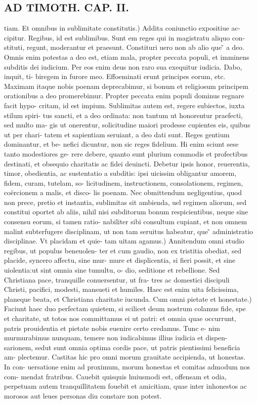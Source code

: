 \documentclass{article}
\begin{document}
\begin{pages}
\section*{AD TIMOTH. CAP. II. }
\marginpar{[ p.481 ]}\pstart tiam. Et omnibus in sublimitate constitutis.) Addita coniunctio expositiue ac- cipitur. Regibus, id est sublimibus. Sunt em reges qui in magistratu aliquo con- stituti, regunt, moderantur et praesunt. Constituri uero non ab alio que ̃ a deo. Omnis enim potestas a deo est, etiam mala, propter peccata populi, et imminens subditis dei iudicium. Per eos enim deus non raro sua exequitur iudicia. Dabo, inquit, ti- biregem in furore meo. Effoeminati erunt principes eorum, etc. Maximam itaque  nobis poenam deprecabimur, si bonum et religiosum principem orationibus a deo promerebimur. Propter peccata enim populi dominus regnare facit hypo- critam, id est impium. Sublimitas autem est, regere subiectos, iuxta stilum spiri- tus sancti, et a deo ordinata: non tantum ut honorentur praefecti, sed multo ma- gis ut onerentur, solicitudine maiori prodesse cupientes eis, quibus ut per chari- tatem et sapientiam seruiant, a deo dati sunt. Reges gentium dominantur, et be- nefici dicuntur, non sic reges fidelium. Hi enim sciunt sese tanto modestiores ge- rere debere, quanto sunt plurium commodis et profectibus destinati, et obsequio charitatis ac fidei deuincti. Debetur ipsis honor, reuerentia, timor, obedientia, ac sustentatio a subditis: ipsi uicissim obligantur amorem, fidem, curam, tutelam, so- licitudinem, instructionem, consolationem, regimen, coërcionem a malis, et disco- lis poenam. Nec obmittendum negligentius, quod non prece, pretio et instantia, sublimitas sit ambienda, uel regimen aliorum, sed constitui oportet ab aliis, nihil nisi subditorum bonum respicientibus, neque sine consensu eorum, si tamen ratio- nabiliter sibi consultum cupiant, et non omnem malint subterfugere disciplinam, ut non tam seruitus habeatur, que ̃ administratio disciplinae. Vt placidam et quie- tam uitam agamus.) Annitendum omni studio regibus, ut populus beneuolen- ter et cum gaudio, non ex tristitia obediat, sed placide, syncero affectu, sine mur- mure et displicentia, si fieri possit, et sine uiolentia:ut sint omnia sine tumultu, o- dio, seditione et rebellione. Sed Christiana pace, tranquille conuersentur, ut fra- tres ac domestici discipuli Christi, pacifici, modesti, mansueti et humiles. Haec est enim uita felicissima, planeque beata, et Christiana charitate iucunda. Cum omni pietate et honestate.) Faciunt haec duo perfectam quietem, si scilicet deum nostrum colamus fide, spe et charitate, ut totos nos committamus ei ut patri: et omnia quae occurrunt, patris prouidentia et pietate nobis euenire certo credamus. Tunc e- nim murmurabimus nunquam, temere non iudicabimus illius iudicia et dispen- sarionem, sedut sunt omnia optima cordis pace, ut patris pientissimi beneficia am- plectemur. Castitas hic pro omni morum grauitate accipienda, ut honestas. In con- uersatione enim ad proximum, morum honestas et comitas admodum nos com- mendat fratribus. Cauebit quisquis huiusmodi est, offensam et odia, perpetuam autem tranquillitatem fouebit et amicitiam, quae inter inhonestos ac morosos aut leues personas diu constare non potest.  \pend

\end{pages}
\end{document}
